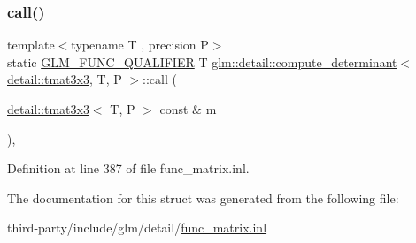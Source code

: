\subsubsection{\texorpdfstring{call()}{call()}}
{\footnotesize\ttfamily template$<$typename T , precision P$>$ \\
static \hyperlink{setup_8hpp_a33fdea6f91c5f834105f7415e2a64407}{G\+L\+M\+\_\+\+F\+U\+N\+C\+\_\+\+Q\+U\+A\+L\+I\+F\+I\+ER} T \hyperlink{structglm_1_1detail_1_1compute__determinant}{glm\+::detail\+::compute\+\_\+determinant}$<$ \hyperlink{structglm_1_1detail_1_1tmat3x3}{detail\+::tmat3x3}, T, P $>$\+::call (\begin{DoxyParamCaption}\item[{\hyperlink{structglm_1_1detail_1_1tmat3x3}{detail\+::tmat3x3}$<$ T, P $>$ const \&}]{m }\end{DoxyParamCaption})\hspace{0.3cm}{\ttfamily [inline]}, {\ttfamily [static]}}



Definition at line 387 of file func\+\_\+matrix.\+inl.



The documentation for this struct was generated from the following file\+:\begin{DoxyCompactItemize}
\item 
third-\/party/include/glm/detail/\hyperlink{func__matrix_8inl}{func\+\_\+matrix.\+inl}\end{DoxyCompactItemize}
